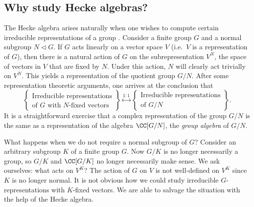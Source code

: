 \subsection*{Why study Hecke algebras?}
The Hecke algebra arises naturally when one wishes to compute certain irreducible representations of a group \cite{Williamson21,CMHL03}.
Consider a finite group $G$ and a normal subgroup $N\triangleleft G$.
If $G$ acts linearly on a vector space $V$ (i.e.\ $V$ is a representation of $G$), then there is a natural action of $G$ on the subrepresentation $V^N$, the space of vectors in $V$ that are fixed by $N$.
Under this action, $N$ will clearly act trivially on $V^N$.
This yields a representation of the quotient group $G/N$.
After some representation theoretic arguments, one arrives at the conclusion that
\[
	\left\{\begin{array}{c}
		\text{Irreducible representations} \\
		\text{of $G$ with $N$-fixed vectors}
	\end{array}\right\}
	\stackrel{1:1}{\longleftrightarrow}
	\left\{\begin{array}{c}
		\text{Irreducible representations} \\
		\text{of $G/N$}
	\end{array}\right\}.
\]
It is a straightforward exercise that a complex representation of the group $G/N$ is the same as a representation of the algebra $\CC[G/N]$, the \emph{group algebra} of $G/N$.

What happens when we do not require a normal subgroup of $G$? Consider an arbitrary subgroup $K$ of a finite group $G$.
Now $G/K$ is no longer necessarily a group, so $G/K$ and $\CC[G/K]$ no longer necessarily make sense.
We ask ourselves: what acts on $V^K$?
The action of $G$ on $V$ is not well-defined on $V^K$ since $K$ is no longer normal.
It is not obvious how we could study irreducible $G$-representations with $K$-fixed vectors.
We are able to salvage the situation with the help of the Hecke algebra.


